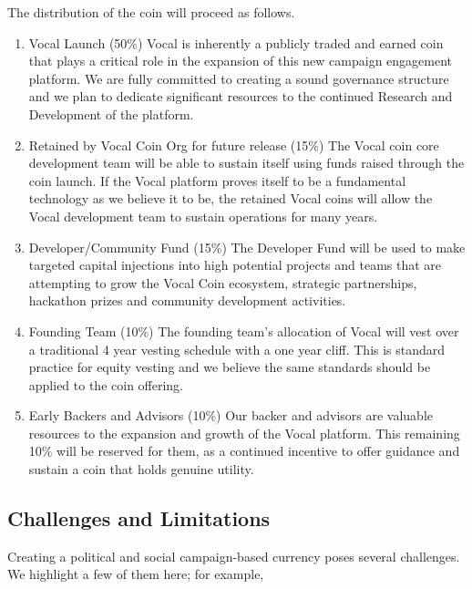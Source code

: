 \documentclass[conference]{IEEEtran}
\begin{document}
    The distribution of the coin will proceed as follows.

    \begin{enumerate}
    \item Vocal Launch (50\%)
   Vocal is inherently a publicly traded and earned coin that plays a critical role in the expansion of this new campaign engagement platform. We are fully committed to creating a sound governance structure and we plan to dedicate significant resources to the continued Research and Development of the platform.
    \item Retained by Vocal Coin Org for future release (15\%)
    The Vocal coin core development team will be able to sustain itself using funds raised through the coin launch. If the Vocal platform proves itself to be a fundamental technology as we believe it to be, the retained Vocal coins will allow the Vocal development team to sustain operations for many years.
    \item Developer/Community Fund (15\%)
    The Developer Fund will be used to make targeted capital injections into high potential projects and teams that are attempting to grow the Vocal Coin ecosystem, strategic partnerships, hackathon prizes and community development activities.
    \item Founding Team (10\%)
    The founding team’s allocation of Vocal will vest over a traditional 4 year vesting schedule with a one year cliff. This is standard practice for equity vesting and we believe the same standards should be applied to the coin offering. 
    \item Early Backers and Advisors (10\%)
    Our backer and advisors are valuable resources to the expansion and growth of the Vocal platform. This remaining 10\% will be reserved for them, as a continued incentive to offer guidance and sustain a coin that holds genuine utility.
    \end{enumerate}
    


    \subsection{Challenges and Limitations}
    Creating a political and social campaign-based currency poses several challenges. We highlight a few of them here; for example,
\end{document}
